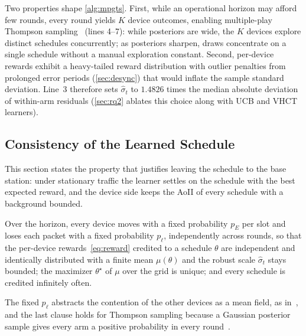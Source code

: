 \documentclass[conference]{IEEEtran}
\begin{document}
  Two properties shape \autoref{alg:mpgts}.
  First, while an operational horizon may afford few rounds, every round yields $K$ device outcomes, enabling multiple-play Thompson sampling~\cite{thompson1933likelihood,agrawal2012analysis,komiyama2015optimal} (lines 4--7): while posteriors are wide, the $K$ devices explore distinct schedules concurrently; as posteriors sharpen, draws concentrate on a single schedule without a manual exploration constant.
  Second, per-device rewards exhibit a heavy-tailed reward distribution with outlier penalties from prolonged error periods (\autoref{sec:desync}) that would inflate the sample standard deviation.
  Line~3 therefore sets $\hat\sigma_t$ to $1.4826$ times the median absolute deviation of within-arm residuals (\autoref{sec:rq2} ablates this choice along with \textsc{UCB} and \textsc{VHCT}~\cite{li2021optimum} learners).

\subsection{Consistency of the Learned Schedule}
\label{sec:theory}
  This section states the property that justifies leaving the schedule to the base station: under stationary traffic the learner settles on the schedule with the best expected reward, and the device side keeps the AoII of every schedule with a background bounded.

  \begin{assumption}
  \label{as:stationary}
  Over the horizon, every device moves with a fixed probability $p_E$ per slot and loses each packet with a fixed probability $p_\ell$, independently across rounds, so that the per-device rewards~\eqref{eq:reward} credited to a schedule $\theta$ are independent and identically distributed with a finite mean $\mu(\theta)$ and the robust scale $\hat\sigma_t$ stays bounded; the maximizer $\theta^\star$ of $\mu$ over the grid is unique; and every schedule is credited infinitely often.
  \end{assumption}
  The fixed $p_\ell$ abstracts the contention of the other devices as a mean field, as in~\cite{le2024mftts}, and the last clause holds for Thompson sampling because a Gaussian posterior sample gives every arm a positive probability in every round~\cite{agrawal2012analysis}.
\end{document}
